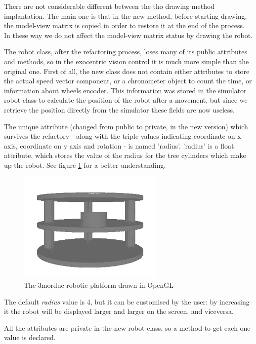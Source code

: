 %
There are not considerable different between the tho 
drawing method implantation. The main one is that in the 
new method, before starting drawing, the model-view matrix 
is copied in order to restore it at the end of the process. 
In these way we do not affect the model-view matrix status 
by drawing the robot.
%

%
The robot class, after the refactoring process, loses many 
of its public attributes and methods, so in the
exocentric vision control it is much more simple than the 
original one. First of all, the new class does not contain either
attributes to store the actual speed vector component, or 
a chronometer object to count the time, or information about wheels
encoder. This information was stored in the simulator robot 
class to calculate the position of the robot after a movement,
but since we retrieve the position directly from the simulator 
these fields are now useless. 
%

%
The unique attribute (changed from public to private, in 
the new version) which survives the refactory - along with the
triple values indicating coordinate on x axis, coordinate on 
y axis and rotation - is named 'radius'. 'radius' is a float
attribute, which stores the value of the radius for the 
tree cylinders which make up the robot. See figure
\ref{fig:3morduc_opengl} for a better understanding.
%
\begin{figure}[!h]
  \begin{center}
    \includegraphics[width=200pt]{img/3morduc_opengl.png}  %
    \caption{The 3morduc robotic platform drawn in OpenGL}
    \label{fig:3morduc_opengl}
  \end{center}
\end{figure}
%
The default \textit{radius} value is 4, but it can be 
customised by the user: by increasing it the robot will be 
displayed larger and larger on the screen, and viceversa.
%

%
All the attributes are private in the new robot class, 
so a method to get each one value is declared. 
%

